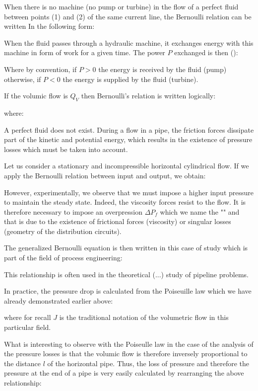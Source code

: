 	When there is no machine (no pump or turbine) in the flow of a perfect fluid between points (1) and (2) of the same current line, the Bernoulli relation can be written In the following form:
	
	When the fluid passes through a hydraulic machine, it exchanges energy with this machine in  form of work for a given time. The power $P$ exchanged is then ():
	
	Where by convention, if $P>0$ the energy is received by the fluid (pump) otherwise, if $P<0$ the energy is supplied by the fluid (turbine).

	If the volumic flow is $Q_V$ then Bernoulli's relation is written logically:
	
	where:
	
	A perfect fluid does not exist. During a flow in a pipe, the friction forces dissipate part of the kinetic and potential energy, which results in the existence of pressure losses which must be taken into account.
	
	Let us consider a stationary and incompressible horizontal cylindrical flow. If we apply the Bernoulli relation between input and output, we obtain:
	
	However, experimentally, we observe that we must impose a higher input pressure to maintain the steady state. Indeed, the viscosity forces resist to the flow. It is therefore necessary to impose an overpression $\Delta P_f$ which we name the "" and that is due to the existence of frictional forces (viscosity) or singular losses (geometry of the distribution circuits).

	The generalized Bernoulli equation is then written in this case of study which is part of the field of process engineering:
	
	This relationship is often used in the theoretical (...) study of pipeline problems.

	In practice, the pressure drop is calculated from the Poiseuille law which we have already demonstrated earlier above:
	
	where for recall $J$ is the traditional notation of the volumetric flow in this particular field.
	
	What is interesting to observe with the Poiseulle law in the case of the analysis of the pressure losses is that the volumic flow is therefore inversely proportional to the distance $l$ of the horizontal pipe. Thus, the loss of pressure and therefore the pressure at the end of a pipe is very easily calculated by rearranging the above relationship:
	
